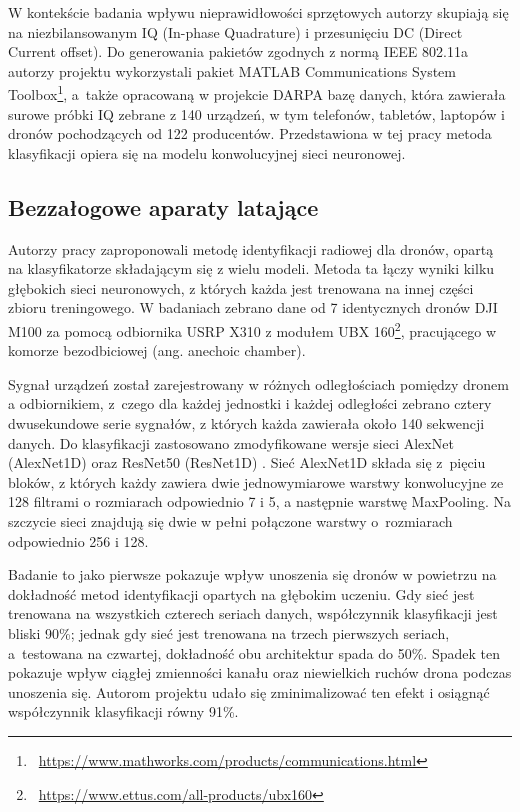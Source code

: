 W kontekście badania wpływu nieprawidłowości sprzętowych autorzy skupiają się na niezbilansowanym IQ (In-phase Quadrature) i przesunięciu DC (Direct Current offset). Do generowania pakietów zgodnych z normą IEEE 802.11a autorzy projektu wykorzystali pakiet MATLAB Communications System Toolbox\footnote{~\url{https://www.mathworks.com/products/communications.html}}, a~także opracowaną w projekcie DARPA \cite{darpa_spectrum_2017} bazę danych, która zawierała surowe próbki IQ zebrane z 140 urządzeń, w tym telefonów, tabletów, laptopów i dronów pochodzących od 122 producentów. Przedstawiona w tej pracy metoda klasyfikacji opiera się na modelu konwolucyjnej sieci neuronowej.

\subsection{Bezzałogowe aparaty latające}
Autorzy pracy \cite{soltani2021RF} zaproponowali metodę identyfikacji radiowej dla dronów, opartą na klasyfikatorze składającym się z wielu modeli. Metoda ta łączy wyniki kilku głębokich sieci neuronowych, z których każda jest trenowana na innej części zbioru treningowego. W badaniach zebrano dane od 7 identycznych dronów DJI M100 za pomocą odbiornika USRP X310 z modułem UBX 160\footnote{~\url{https://www.ettus.com/all-products/ubx160}}, pracującego w komorze bezodbiciowej (ang. anechoic chamber).

Sygnał urządzeń został zarejestrowany w różnych odległościach pomiędzy dronem a odbiornikiem, z~czego dla każdej jednostki i każdej odległości zebrano cztery dwusekundowe serie sygnałów, z których każda zawierała około 140 sekwencji danych. Do klasyfikacji zastosowano zmodyfikowane wersje sieci AlexNet (AlexNet1D) \cite{NIPS2012_c399862d} oraz ResNet50 (ResNet1D) \cite{he2015deepresiduallearningimage}. Sieć AlexNet1D składa się z~pięciu bloków, z których każdy zawiera dwie jednowymiarowe warstwy konwolucyjne ze 128 filtrami o rozmiarach odpowiednio 7 i 5, a następnie warstwę MaxPooling. Na szczycie sieci znajdują się dwie w pełni połączone warstwy o~rozmiarach odpowiednio 256 i 128.

Badanie to jako pierwsze pokazuje wpływ unoszenia się dronów w powietrzu na dokładność metod identyfikacji opartych na głębokim uczeniu. Gdy sieć jest trenowana na wszystkich czterech seriach danych, współczynnik klasyfikacji jest bliski 90\%; jednak gdy sieć jest trenowana na trzech pierwszych seriach, a~testowana na czwartej, dokładność obu architektur spada do 50\%. Spadek ten pokazuje wpływ ciągłej zmienności kanału oraz niewielkich ruchów drona podczas unoszenia się. Autorom projektu udało się zminimalizować ten efekt i osiągnąć współczynnik klasyfikacji równy 91\%.

